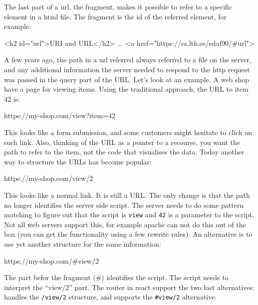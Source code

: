 The last part of a url, the fragment, makes it possible to refer to a specific element in a html file. The fragment is the id of the referred element, for example:
\begin{Code}
<h2 id="url">URI and URL</h2>
...
<a href="https://cs.lth.se/edaf90/#url">
\end{Code}

A few years ago, the path in a url referred always referred to a file on the server, and any additional information the server needed to respond to the http request was passed in the query part of the URL. Let's look at an example. A web shop have a page for viewing items. Using the traditional approach, the URL to item 42 is:
\begin{Code}
https://my-shop.com/view?item=42
\end{Code}
This looks like a form submission, and some customers might hesitate to click on such link. Also, thinking of the URL as a pointer to a recourse, you want the path to refer to the item, not the code that visualises the data. Today another way to structure the URLs has become popular:
\begin{Code}
https://my-shop.com/view/2
\end{Code}
This looks like a normal link. It is still a URL. The only change is that the path no longer identifies the server side script. The server needs to do some pattern matching to figure out that the script is \texttt{view} and \texttt{42} is a parameter to the script. Not all web servers support this, for example apache can not do this out of the box (you can get the functionality using a few rewrite rules). An alternative is to use yet another structure for the same information:
\begin{Code}
https://my-shop.com/#view/2
\end{Code}
The part befor the fragment (\#) identifies the script. The script needs to interpret the ``view/2'' part. The router in react support the two last alternatives:  handles the \texttt{/view/2} structure, and  supports the \texttt{\#view/2} alternative.

